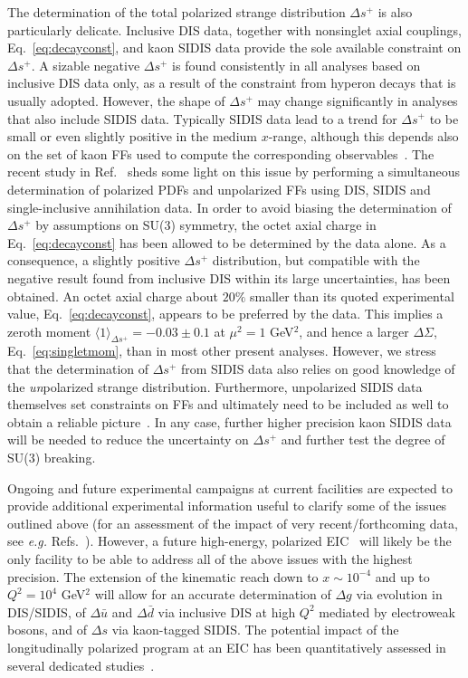 The determination of the total polarized strange distribution $\Delta s^+$ is 
also particularly delicate.
%
Inclusive DIS data, together with nonsinglet axial couplings, 
Eq.~\eqref{eq:decayconst}, and kaon SIDIS data provide the sole available 
constraint on $\Delta s^+$.
%
A sizable negative $\Delta s^+$ is found 
consistently in all analyses based on inclusive DIS data only, as a result 
of the constraint from hyperon decays that is usually adopted. 
%
However, the shape of $\Delta s^+$ may change significantly in analyses that also include
SIDIS data. Typically SIDIS data lead to a trend for $\Delta s^+$ to be
small or even slightly positive in the medium $x$-range, although this depends 
also on the set of kaon FFs used to compute
the corresponding observables~\cite{Leader:2011tm}.  
%
The recent study in Ref.~\cite{Ethier:2017zbq} sheds some light on this issue
by performing a simultaneous determination of polarized PDFs and unpolarized 
FFs using DIS, SIDIS and single-inclusive annihilation data.
%
In order to avoid biasing the determination of $\Delta s^+$ by 
assumptions on SU(3) symmetry, the octet axial charge in 
Eq.~\eqref{eq:decayconst} has been allowed to be determined by the data alone.
%
As a consequence, a slightly positive $\Delta s^+$ distribution, but
compatible with the negative result found from inclusive DIS within its 
large uncertainties, has been obtained.
% 
An octet axial charge about $20\%$ smaller than its quoted experimental value, 
Eq.~\eqref{eq:decayconst}, appears to be preferred by the data.
%
This implies a zeroth moment $\langle 1\rangle_{\Delta s^+}=-0.03 \pm 0.1$ at 
$\mu^2=1$ GeV$^2$, and hence a larger $\Delta\Sigma$, Eq.~\eqref{eq:singletmom},
than in most other present analyses.
%
However, we stress that the determination of $\Delta s^+$ from SIDIS data 
also relies on good knowledge of the {\it un}polarized strange distribution. 
%
Furthermore, unpolarized SIDIS data themselves set constraints on 
FFs and ultimately need to be included as well
to obtain a reliable picture~\cite{Borsa:2017vwy}. 
%
In any case, further higher precision kaon SIDIS data will be needed 
to reduce the uncertainty on $\Delta s^+$ and further test the degree of 
SU(3) breaking. 

Ongoing and future experimental campaigns at current facilities are
expected to provide additional experimental information
useful to clarify some of the issues outlined above (for an 
assessment of the impact of very recent/forthcoming data, see {\it e.g.}
Refs.~\cite{Aschenauer:2015eha,Aschenauer:2015ata,Nocera:2015vva,
Nocera:2017wep}).
%
However, a future high-energy, polarized EIC~\cite{Accardi:2012qut} will 
likely be the only facility to be able to address all of the above issues 
with the highest precision. 
% 
The extension of the kinematic reach down to $x\sim 10^{-4}$ and up to
$Q^2=10^4$ GeV$^2$ will allow for an accurate determination of $\Delta g$
via evolution in DIS/SIDIS, of $\Delta\bar{u}$ and 
$\Delta\bar{d}$ via inclusive DIS at high $Q^2$ mediated by electroweak bosons,
and of $\Delta s$ via kaon-tagged SIDIS. 
%
The potential impact of the longitudinally polarized program at an EIC
has been quantitatively assessed in several dedicated 
studies~\cite{Aschenauer:2012ve,Ball:2013tyh,Aschenauer:2013iia,
Aschenauer:2015ata}.

